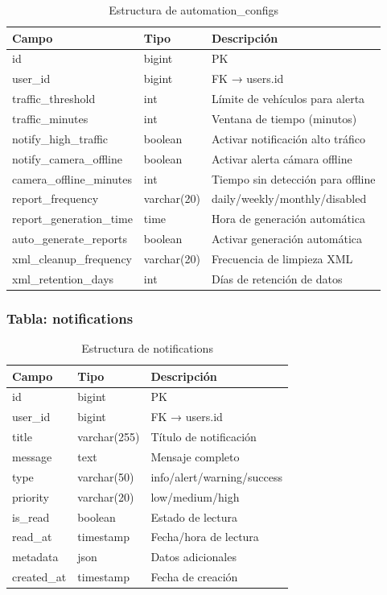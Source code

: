 \documentclass[12pt,a4paper]{article}
\begin{document}
\begin{table}[H]
\centering
\small
\begin{tabular}{|l|l|p{6cm}|}
\hline
\textbf{Campo} & \textbf{Tipo} & \textbf{Descripción} \\
\hline
id & bigint & PK \\
user\_id & bigint & FK → users.id \\
traffic\_threshold & int & Límite de vehículos para alerta \\
traffic\_minutes & int & Ventana de tiempo (minutos) \\
notify\_high\_traffic & boolean & Activar notificación alto tráfico \\
notify\_camera\_offline & boolean & Activar alerta cámara offline \\
camera\_offline\_minutes & int & Tiempo sin detección para offline \\
report\_frequency & varchar(20) & daily/weekly/monthly/disabled \\
report\_generation\_time & time & Hora de generación automática \\
auto\_generate\_reports & boolean & Activar generación automática \\
xml\_cleanup\_frequency & varchar(20) & Frecuencia de limpieza XML \\
xml\_retention\_days & int & Días de retención de datos \\
\hline
\end{tabular}
\caption{Estructura de automation\_configs}
\end{table}

\subsubsection{Tabla: notifications}

\begin{table}[H]
\centering
\small
\begin{tabular}{|l|l|p{5cm}|}
\hline
\textbf{Campo} & \textbf{Tipo} & \textbf{Descripción} \\
\hline
id & bigint & PK \\
user\_id & bigint & FK → users.id \\
title & varchar(255) & Título de notificación \\
message & text & Mensaje completo \\
type & varchar(50) & info/alert/warning/success \\
priority & varchar(20) & low/medium/high \\
is\_read & boolean & Estado de lectura \\
read\_at & timestamp & Fecha/hora de lectura \\
metadata & json & Datos adicionales \\
created\_at & timestamp & Fecha de creación \\
\hline
\end{tabular}
\caption{Estructura de notifications}
\end{table}
\end{document}
